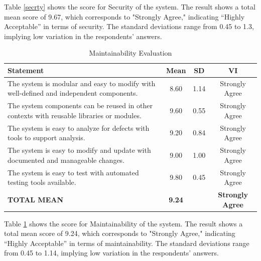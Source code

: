	Table \ref{secrty} shows the score for Security of the system. The result shows a total mean score of 9.67, which corresponds to "Strongly Agree," indicating “Highly Acceptable” in terms of security. The standard deviations range from 0.45 to 1.3, implying low variation in the respondents’ answers.
	
	\begin{table}[h!]
		\centering
		\caption{Maintainability Evaluation}
		\label{mntnblty}
		\renewcommand{\arraystretch}{1.2}
		\begin{tabularx}{\linewidth}{|X|c|c|c|}
			\hline
			\textbf{Statement} & \textbf{Mean} & \textbf{SD} & \textbf{VI} \\ \hline
			The system is modular and easy to modify with well-defined and independent components.
			& 8.60 & 1.14 & Strongly Agree \\ \hline
			The system components can be reused in other contexts with reusable libraries or modules.
			& 9.60 & 0.55 & Strongly Agree \\ \hline
			The system is easy to analyze for defects with tools to support analysis.
			& 9.20 & 0.84 & Strongly Agree \\ \hline
			The system is easy to modify and update with documented and manageable changes.
			& 9.00 & 1.00 & Strongly Agree \\ \hline
			The system is easy to test with automated testing tools available.
			& 9.80 & 0.45 & Strongly Agree \\ \hline
			\textbf{TOTAL MEAN} & \textbf{9.24} & & \textbf{Strongly Agree} \\ \hline
		\end{tabularx}
	\end{table}
	
	Table \ref{mntnblty} shows the score for Maintainability of the system. The result shows a total mean score of 9.24, which corresponds to "Strongly Agree," indicating “Highly Acceptable” in terms of maintainability. The standard deviations range from 0.45 to 1.14, implying low variation in the respondents’ answers.
	
